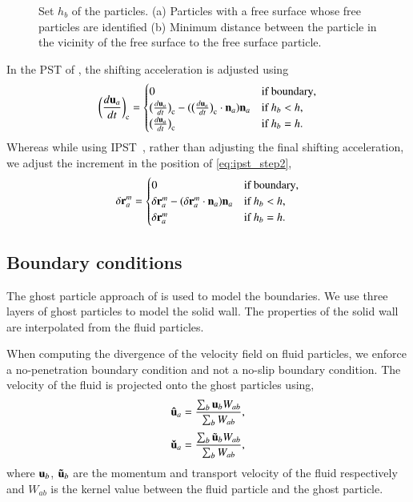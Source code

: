 \begin{figure}
\begin{subfigure}{0.1\textwidth}
    \subcaption{}%
    \label{fig:pst_free_surf_zoomed}
  \end{subfigure}
  \caption{
    Set $h_b$ of the particles. (a) Particles with a free surface whose
    free particles are identified (b) Minimum distance between the particle in
    the vicinity of the free surface to the free surface particle.}
\label{fig:pst_free_surf}
\end{figure}
%


In the PST of \cite{sun_consistent_2019}, the shifting acceleration is
adjusted using
\begin{equation}
 \label{eq:shifting_force_free_surface_adjust_sun2019}
 \bigg(\frac{d \mathbf{u}_a}{dt}\bigg)_{\text{c}} =\begin{cases}
   0& \text{if boundary},\\
   \big(\frac{d \mathbf{u}_a}{dt}\big)_{\text{c}}  - (\big(\frac{d \mathbf{u}_a}{dt}\big)_{\text{c}} \cdot \mathbf{n}_a) \mathbf{n}_a& \text{if $h_b < h$},\\
   \big(\frac{d \mathbf{u}_a}{dt}\big)_{\text{c}}& \text{if $h_b = h$}.
 \end{cases}
\end{equation}
Whereas while using IPST~\citep{huang_kernel_2019}, rather than adjusting the
final shifting acceleration, we adjust the increment in the position of
\cref{eq:ipst_step2},
\begin{equation}
 \label{eq:shifting_force_free_surface_adjust_ipst}
 \delta \mathbf{r}_a^{m} =\begin{cases}
   0& \text{if boundary},\\
   \delta \mathbf{r}_a^{m} - (\delta \mathbf{r}_a^{m}  \cdot \mathbf{n}_a) \mathbf{n}_a& \text{if $h_b < h$},\\
   \delta \mathbf{r}_a^{m}& \text{if $h_b = h$}.
 \end{cases}
\end{equation}

\subsection{Boundary conditions}

The ghost particle approach of \cite{Adami2012} is used to model the
boundaries. We use three layers of ghost particles to model the solid wall.
The properties of the solid wall are interpolated from the fluid particles.

When computing the divergence of the velocity field on fluid particles, we
enforce a no-penetration boundary condition and not a no-slip boundary
condition. The velocity of the fluid is projected onto the ghost particles
using,
\begin{equation}
  \label{eq:v-ghost}
  \mathbf{\hat{u}}_a = \frac{\sum_b\mathbf{u}_b W_{ab}}{\sum_b W_{ab}},
\end{equation}
\begin{equation}
  \label{eq:v-hat-ghost}
  \mathbf{\check{u}}_a = \frac{\sum_b\tilde{\mathbf{u}}_b W_{ab}}{\sum_b W_{ab}},
\end{equation}
where $\mathbf{u}_b$, $\mathbf{\tilde{u}}_b$ are the momentum and transport velocity
of the fluid respectively and $W_{ab}$ is the kernel value between the fluid
particle and the ghost particle.

